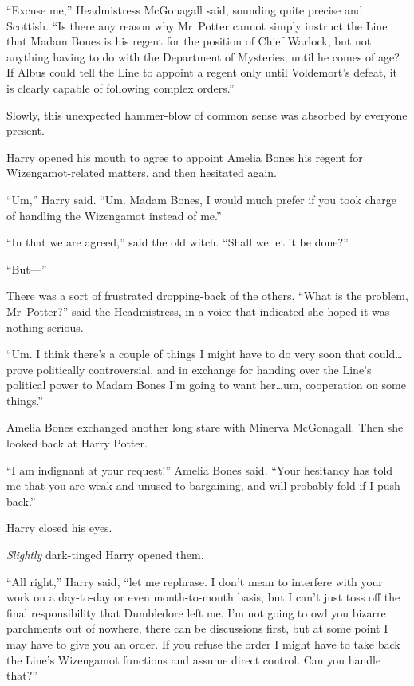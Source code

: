 “Excuse me,” Headmistress McGonagall said, sounding quite precise and Scottish. “Is there any reason why Mr~Potter cannot simply instruct the Line that Madam Bones is his regent for the position of Chief Warlock, but not anything having to do with the Department of Mysteries, until he comes of age? If Albus could tell the Line to appoint a regent only until Voldemort’s defeat, it is clearly capable of following complex orders.”

Slowly, this unexpected hammer-blow of common sense was absorbed by everyone present.

Harry opened his mouth to agree to appoint Amelia Bones his regent for Wizengamot-related matters, and then hesitated again.

“Um,” Harry said. “Um. Madam Bones, I would much prefer if you took charge of handling the Wizengamot instead of me.”

“In that we are agreed,” said the old witch. “Shall we let it be done?”

“But—”

There was a sort of frustrated dropping-back of the others. “What is the problem, Mr~Potter?” said the Headmistress, in a voice that indicated she hoped it was nothing serious.

“Um. I think there’s a couple of things I might have to do very soon that could…prove politically controversial, and in exchange for handing over the Line’s political power to Madam Bones I’m going to want her…um, cooperation on some things.”

Amelia Bones exchanged another long stare with Minerva McGonagall. Then she looked back at Harry Potter.

“I am indignant at your request!” Amelia Bones said. “Your hesitancy has told me that you are weak and unused to bargaining, and will probably fold if I push back.”

Harry closed his eyes.

\emph{Slightly} dark-tinged Harry opened them.

“All right,” Harry said, “let me rephrase. I don’t mean to interfere with your work on a day-to-day or even month-to-month basis, but I can’t just toss off the final responsibility that Dumbledore left me. I’m not going to owl you bizarre parchments out of nowhere, there can be discussions first, but at some point I may have to give you an order. If you refuse the order I might have to take back the Line’s Wizengamot functions and assume direct control. Can you handle that?”

